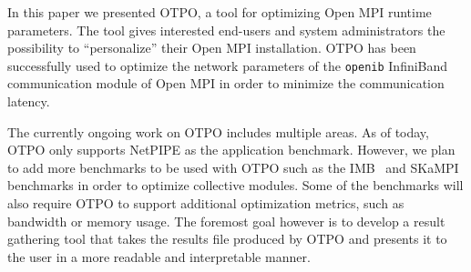 In this paper we presented OTPO, a tool for optimizing Open MPI
runtime parameters.  The tool gives interested end-users and system
administrators the possibility to ``personalize'' their Open MPI
installation. OTPO has been successfully used to optimize the network
parameters of the {\tt openib} InfiniBand communication module of Open
MPI in order to minimize the communication latency.

The currently ongoing work on OTPO includes multiple areas. As of
today, OTPO only supports NetPIPE as the application
benchmark. However, we plan to add more benchmarks to be used with
OTPO such as the IMB~\cite{imb}%
and SKaMPI~\cite{skampi} benchmarks in order to optimize collective modules. 
Some of the benchmarks will also require OTPO to support additional optimization
metrics, such as bandwidth or memory usage. The foremost goal however
is to develop a result gathering tool that takes the results file
produced by OTPO and presents it to the user in a more readable and
interpretable manner.

